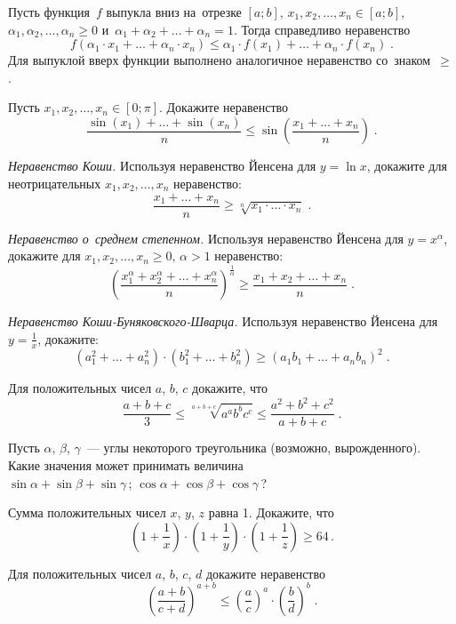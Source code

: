 \begin{problems}

\item{}
Пусть функция~$f$ выпукла вниз на~отрезке $[a;b]$,
$x_1, x_2, \ldots, x_n \in [a; b]$,
$\alpha_1, \alpha_2, \ldots, \alpha_n \geq 0$
и~$\alpha_1 + \alpha_2 + \ldots + \alpha_n = 1$.
Тогда справедливо неравенство
\[
    f(\alpha_1 \cdot x_1 + \ldots + \alpha_n \cdot x_n)
\leq
    \alpha_1 \cdot f(x_1) + \ldots + \alpha_n \cdot f(x_n)
\;.\]
Для выпуклой вверх функции выполнено аналогичное неравенство со~знаком~$\geq$.

\item
Пусть $x_1, x_2, \ldots, x_n \in [0; \pi]$.
Докажите неравенство 
\[
    \frac{\sin(x_1) + \ldots + \sin(x_n)}{n}
\leq
    \sin\left(
        \frac{x_1 + \ldots + x_n}{n}
    \right)
\;.\]

\item\emph{Неравенство Коши.}
Используя неравенство Йенсена для $y = \ln x$, докажите для неотрицательных
$x_1, x_2, \ldots, x_n$ неравенство:
\[
    \frac{x_1 + \ldots + x_n}{n}
\geq
    \sqrt[n]{x_1 \cdot \ldots \cdot x_n}
\;.\]

\item\emph{Неравенство о~среднем степенном.}
Используя неравенство Йенсена для $y = x^{\alpha}$, докажите для
$x_1, x_2, \ldots, x_n \geq 0$, $\alpha > 1$ неравенство:
\[
    \left(
        \frac{
            x_1^{\alpha} + x_2^{\alpha} + \ldots + x_n^{\alpha}
        }{n}
    \right)^{\frac{1}{\alpha}}
\geq
    \frac{x_1 + x_2 + \ldots + x_n}{n}
\;.\]

\item\emph{Неравенство Коши-Буняковского-Шварца.}
Используя неравенство Йенсена для $y = \frac{1}{x}$, докажите:
\[
    (a_1^2 + \ldots + a_n^2) \cdot (b_1^2 + \ldots + b_n^2)
\geq
    (a_1 b_1 + \ldots + a_n b_n)^2
\;.\]

\item
Для положительных чисел $a$, $b$, $c$ докажите, что
\[
    \frac{a + b + c}{3}
\leq
    \sqrt[a+b+c]{a^a b^b c^c}
\leq
    \frac{a^2 + b^2 + c^2}{a + b + c}
\;.\]

\item
Пусть $\alpha$, $\beta$, $\gamma$~--- углы некоторого треугольника
(возможно, вырожденного).
Какие значения может принимать величина
\\
\subproblem $\sin \alpha + \sin \beta + \sin \gamma$\,;
\quad
\subproblem $\cos \alpha + \cos \beta + \cos \gamma$\,?

\item
Сумма положительных чисел $x$, $y$, $z$ равна 1.
Докажите, что
\[
    \left( 1 + \frac{1}{x} \right) \cdot
    \left( 1 + \frac{1}{y} \right) \cdot
    \left( 1 + \frac{1}{z} \right)
\geq
    64
\,.\]

\item
Для положительных чисел $a$, $b$, $c$, $d$ докажите неравенство
\[
    \left(\frac{a+b}{c+d}\right)^{a+b}
\leq
    \left(\frac{a}{c}\right)^a
    \cdot
    \left(\frac{b}{d}\right)^b
\;.\]

\end{problems}

